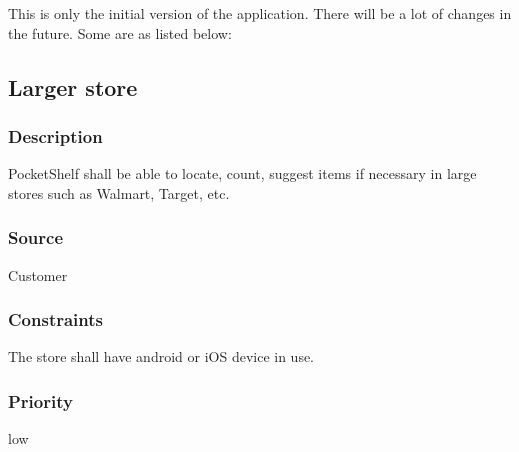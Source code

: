 
This is only the initial version of the application. There will be a lot of changes in the future. Some are as listed below:

\subsection{Larger store}
\subsubsection{Description}
PocketShelf shall be able to locate, count, suggest items if necessary in large stores such as Walmart, Target, etc.
\subsubsection{Source}
Customer
\subsubsection{Constraints}
The store shall have android or iOS device in use.

\subsubsection{Priority}
low

